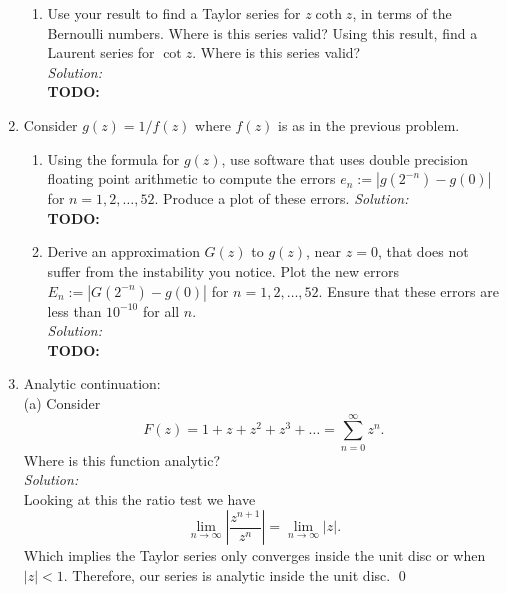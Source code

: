 \documentclass[10pt]{amsart}
\theoremstyle{nonumberplain}
\begin{document}
\begin{enumerate}[label={\bf {\arabic*}:}]
\begin{enumerate}
\item Use your result to find a Taylor series for $z \operatorname{coth} z$, in terms of the Bernoulli numbers. Where is this series valid? Using this result, find a Laurent series for $\cot z$. Where is this series valid?  \\
\textit{Solution:} \\
\textbf{TODO:} \\
\end{enumerate}
\newpage

\item Consider $g(z) = 1/f(z)$ where $f(z)$ is as in the previous
  problem.
  \begin{enumerate}
  \item Using the formula for $g(z)$, use software that uses double
    precision floating point arithmetic to compute the errors $e_n:=
    |g(2^{-n}) - g(0)|$ for $n= 1,2,\ldots, 52$.  Produce a plot of
    these errors.
\textit{Solution:} \\
\textbf{TODO:} \\

  \item Derive an approximation $G(z)$ to $g(z)$, near $z = 0$, that does not suffer
    from the instability you notice.  Plot the new errors $E_n:=
    |G(2^{-n}) - g(0)|$ for $n= 1,2,\ldots, 52$.  Ensure that these
    errors are less than $10^{-10}$ for all $n$.\\
\textit{Solution:} \\
\textbf{TODO:} \\
\end{enumerate}
\newpage

\item Analytic continuation: \\
(a) Consider
$$
F(z)=1+z+z^2+z^3+\ldots=\sum_{n=0}^{\infty} z^n .
$$
Where is this function analytic? \\
\textit{Solution:} \\
Looking at this the ratio test we have
$$
\lim_{n \rightarrow \infty} \left| \frac {z^{n + 1}}{z^n} \right| = \lim_{n \rightarrow \infty}\left| z\right|.
$$
Which implies the Taylor series only converges inside the unit disc or when $|z| < 1$.
Therefore, our series is analytic inside the unit disc.
\qed \\


\end{enumerate}
\end{document}

